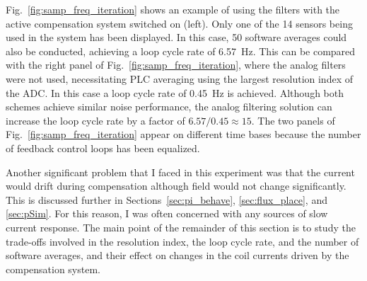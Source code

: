Fig.~\ref{fig:samp_freq_iteration} shows an example of using the
filters with the active compensation system switched on (left).  Only
one of the 14 sensors being used in the system has been displayed.  In
this case, 50 software averages could also be conducted, achieving a
loop cycle rate of 6.57~Hz.  This can be compared with the right panel
of Fig.~\ref{fig:samp_freq_iteration}, where the analog filters were
not used, necessitating PLC averaging using the largest resolution
index of the ADC.  In this case a loop cycle rate of 0.45~Hz is
achieved.  Although both schemes achieve similar noise performance,
the analog filtering solution can increase the loop cycle rate by a
factor of $6.57/0.45\approx 15$.  The two panels of
Fig.~\ref{fig:samp_freq_iteration} appear on different time bases
because the number of feedback control loops has been equalized.



Another significant problem that I faced in this experiment was that
the current would drift during compensation although field would not
change significantly.  This is discussed further in Sections~\ref{sec:pi_behave}, \ref{sec:flux_place}, and \ref{sec:pSim}.  For this reason, I was
often concerned with any sources of slow current response.  The main
point of the remainder of this section is to study the trade-offs
involved in the resolution index, the loop cycle rate, and the number
of software averages, and their effect on changes in the coil currents
driven by the compensation system.


